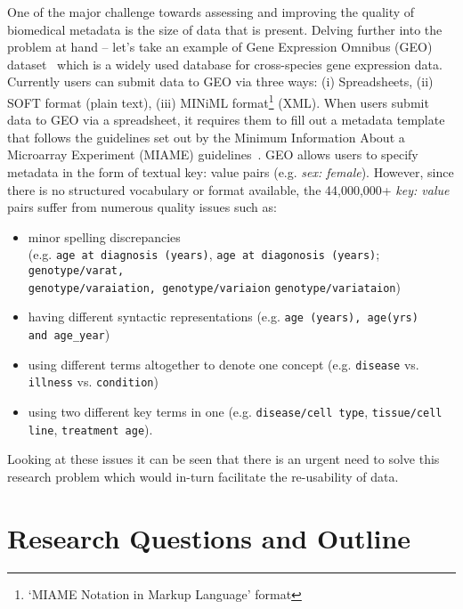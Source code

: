  One of the major challenge towards assessing and improving  the quality of biomedical metadata is the size of data that is present.  Delving further into the problem at hand -- let's take an example of Gene Expression Omnibus (GEO) dataset~\cite{edgar2002gene} which is a widely used database for cross-species gene expression data. Currently users can submit data to GEO via three ways: (i) Spreadsheets, (ii) SOFT format (plain text), (iii) MINiML format\footnote{`MIAME Notation in Markup Language' format} (XML).
When users submit data to GEO via a spreadsheet, it requires them to fill out a metadata template that follows the guidelines set out by the Minimum Information About a Microarray Experiment (MIAME) guidelines~\cite{brazma2001minimum}. GEO allows users to specify metadata in the form of textual key: value pairs (e.g. \emph{sex: female}). However, since there is no structured vocabulary or format available, the 44,000,000+ \emph{key: value} pairs suffer from numerous quality issues such as:
\begin{itemize}
\item minor spelling discrepancies\\ (e.g. \verb|age at diagnosis (years)|, \verb|age at diagonosis (years)|; 
\verb|genotype/varat,|\\ \verb|genotype/varaiation, genotype/variaion| \verb|genotype/variataion|)
\item having different syntactic representations (e.g. \verb|age (years), age(yrs)|\\ \verb|and age_year|)
\item using different terms altogether to denote one concept (e.g. \verb|disease| vs. \verb|illness| vs. \verb|condition|)
\item using two different key terms in one (e.g. \verb|disease/cell type|, \verb|tissue/cell line|, \verb|treatment age|).
\end{itemize} 
Looking at these issues it can be seen that there is an urgent need to solve this research problem which would in-turn facilitate the re-usability of data. 

\section{Research Questions and Outline}

